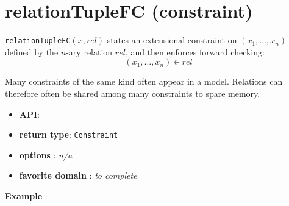 \label{relationtuplefc}
\hypertarget{relationtuplefc}{}

\section{relationTupleFC (constraint)}\label{relationtuplefc:relationtuplefcconstraint}\hypertarget{relationtuplefc:relationtuplefcconstraint}{}
\begin{notedef}
  \texttt{relationTupleFC}$(x,rel)$ states an extensional constraint on $(x_1,\ldots,x_n)$ defined by the $n$-ary relation $rel$, and then enforces forward checking:
$$(x_1,\ldots,x_n)\in rel$$
\end{notedef}
Many constraints of the same kind often appear in a model. Relations can therefore often be shared among many constraints to spare memory.

\begin{itemize}
	\item \textbf{API}: 
	\item \textbf{return type}: \texttt{Constraint}
	\item \textbf{options} : \emph{n/a}
	\item \textbf{favorite domain} : \emph{to complete}
\end{itemize}

\textbf{Example} :


